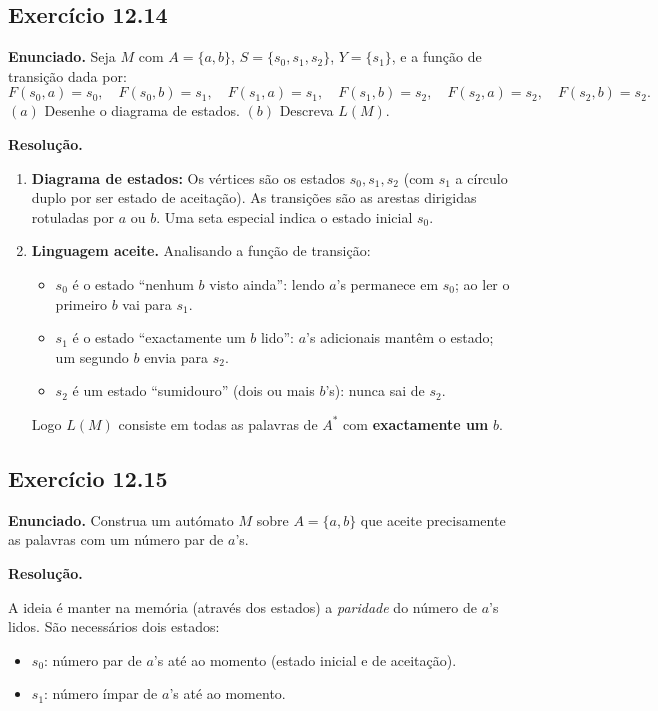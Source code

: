 \documentclass[12pt,a4paper]{article}
\begin{document}
\subsection*{Exercício 12.14}

\textbf{Enunciado.} Seja $M$ com $A = \{a,b\}$, $S = \{s_0, s_1, s_2\}$, $Y = \{s_1\}$,
e a função de transição dada por:
\[
  F(s_0, a) = s_0,\quad F(s_0, b) = s_1,\quad
  F(s_1, a) = s_1,\quad F(s_1, b) = s_2,\quad
  F(s_2, a) = s_2,\quad F(s_2, b) = s_2.
\]
$(a)$ Desenhe o diagrama de estados. $(b)$ Descreva $L(M)$.

\medskip
\textbf{Resolução.}

\begin{enumerate}[label=(\alph*)]
  \item \textbf{Diagrama de estados:}
  Os vértices são os estados $s_0, s_1, s_2$ (com $s_1$ a círculo duplo por ser estado
  de aceitação). As transições são as arestas dirigidas rotuladas por $a$ ou $b$.
  Uma seta especial indica o estado inicial $s_0$.

  \item \textbf{Linguagem aceite.} Analisando a função de transição:
  \begin{itemize}
    \item $s_0$ é o estado ``nenhum $b$ visto ainda'': lendo $a$'s permanece em $s_0$;
          ao ler o primeiro $b$ vai para $s_1$.
    \item $s_1$ é o estado ``exactamente um $b$ lido'': $a$'s adicionais mantêm o estado;
          um segundo $b$ envia para $s_2$.
    \item $s_2$ é um estado ``sumidouro'' (dois ou mais $b$'s): nunca sai de $s_2$.
  \end{itemize}
  Logo $L(M)$ consiste em todas as palavras de $A^*$ com \textbf{exactamente um} $b$.
\end{enumerate}

\subsection*{Exercício 12.15}

\textbf{Enunciado.} Construa um autómato $M$ sobre $A = \{a,b\}$ que aceite precisamente
as palavras com um número par de $a$'s.

\medskip
\textbf{Resolução.}

A ideia é manter na memória (através dos estados) a \emph{paridade} do número de $a$'s
lidos. São necessários dois estados:

\begin{itemize}
  \item $s_0$: número par de $a$'s até ao momento (estado inicial e de aceitação).
  \item $s_1$: número ímpar de $a$'s até ao momento.
\end{itemize}
\end{document}
